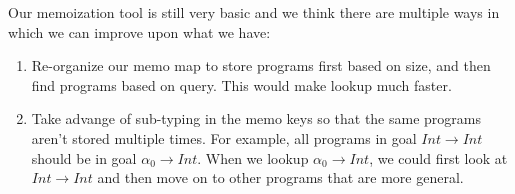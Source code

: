 \documentclass[acmsmall,nonacm]{acmart}
\begin{document}
Our memoization tool is still very basic and we think there are multiple ways in
which we can improve upon what we have:

\begin{enumerate}
  \item Re-organize our memo map to store programs first based on size, and then 
        find programs based on query. This would make lookup much faster.
  \item Take advange of sub-typing in the memo keys so that the same programs
        aren't stored multiple times. For example, all programs in goal 
        $Int \to Int$ should be in goal $\alpha_0 \to Int$. When
        we lookup $\alpha_0 \to Int$, we could first look at $Int \to Int$
        and then move on to other programs that are more general.
\end{enumerate}


 
\end{document}
